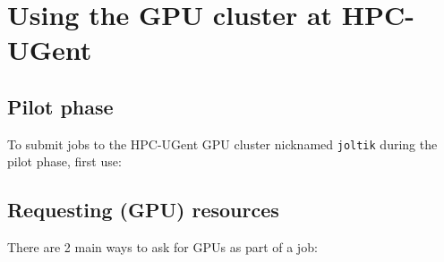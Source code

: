 \chapter{Using the GPU cluster at HPC-UGent}
\label{ch:gpu_ugent}


\section{Pilot phase}
\label{sec:gpu_ugent_pilot}

To submit jobs to the HPC-UGent GPU cluster nicknamed \lstinline|joltik| during the pilot phase, first use:

\begin{prompt}
\end{prompt}





\section{Requesting (GPU) resources}
\label{sec:gpu_ugent_resources}

There are 2 main ways to ask for GPUs as part of a job:

